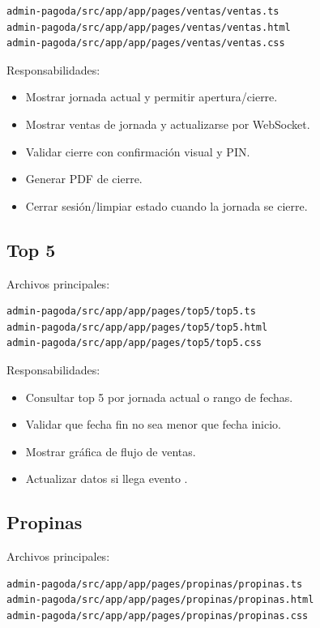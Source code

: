 \documentclass[11pt,letterpaper,openany]{report}
\newcommand{\code}[1]{\texttt{\detokenize{#1}}}
\begin{document}
\begin{lstlisting}
admin-pagoda/src/app/app/pages/ventas/ventas.ts
admin-pagoda/src/app/app/pages/ventas/ventas.html
admin-pagoda/src/app/app/pages/ventas/ventas.css
\end{lstlisting}

Responsabilidades:

\begin{itemize}[leftmargin=*]
  \item Mostrar jornada actual y permitir apertura/cierre.
  \item Mostrar ventas de jornada y actualizarse por WebSocket.
  \item Validar cierre con confirmación visual y PIN.
  \item Generar PDF de cierre.
  \item Cerrar sesión/limpiar estado cuando la jornada se cierre.
\end{itemize}

\subsection{Top 5}

Archivos principales:

\begin{lstlisting}
admin-pagoda/src/app/app/pages/top5/top5.ts
admin-pagoda/src/app/app/pages/top5/top5.html
admin-pagoda/src/app/app/pages/top5/top5.css
\end{lstlisting}

Responsabilidades:

\begin{itemize}[leftmargin=*]
  \item Consultar top 5 por jornada actual o rango de fechas.
  \item Validar que fecha fin no sea menor que fecha inicio.
  \item Mostrar gráfica de flujo de ventas.
  \item Actualizar datos si llega evento \code{/topic/top5}.
\end{itemize}

\subsection{Propinas}

Archivos principales:

\begin{lstlisting}
admin-pagoda/src/app/app/pages/propinas/propinas.ts
admin-pagoda/src/app/app/pages/propinas/propinas.html
admin-pagoda/src/app/app/pages/propinas/propinas.css
\end{lstlisting}
\end{document}
